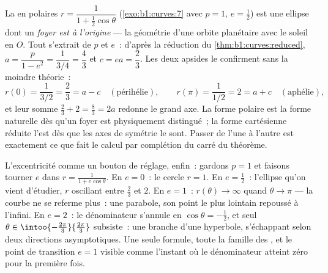 \begin{example}
\label{ex:b1:curves:orbit}
La  en polaires $r = \dfrac{1}{1 + \frac12\cos\theta}$
(\cref{exo:b1:curves:7} avec $p = 1$, $e = \frac12$) est une
ellipse dont un \emph{foyer est à l'origine} --- la géométrie d'une
orbite planétaire avec le soleil en $O$. Tout s'extrait de
$p$ et $e$~: d'après la réduction du
\cref{thm:b1:curves:reduced}, $a = \dfrac{p}{1 - e^2} =
\dfrac{1}{3/4} = \dfrac43$ et $c = ea = \dfrac23$. Les deux
apsides le confirment sans la moindre théorie~:
\[
r(0) = \frac{1}{3/2} = \frac23 = a - c
\quad (\text{périhélie}),
\qquad
r(\pi) = \frac{1}{1/2} = 2 = a + c
\quad (\text{aphélie}),
\]
et leur somme $\frac23 + 2 = \frac83 = 2a$ redonne le grand
axe. La forme polaire est la forme naturelle dès qu'un foyer est
physiquement distingué~; la forme cartésienne réduite l'est dès que
les axes de symétrie le sont. Passer de l'une à l'autre est
exactement ce que fait le calcul par complétion du carré du théorème.

L'excentricité comme un bouton de réglage, enfin~: gardons $p = 1$ et
faisons tourner $e$ dans $r = \frac{1}{1 + e\cos\theta}$. En $e = 0$~:
le cercle $r = 1$. En $e = \frac12$~: l'ellipse qu'on vient d'étudier,
$r$ oscillant entre $\frac23$ et $2$. En $e = 1$~: $r(\theta) \to \infty$
quand $\theta \to \pi$ --- la courbe ne se referme plus~: une parabole, son
point le plus lointain repoussé à l'infini. En $e = 2$~: le dénominateur
s'annule en $\cos\theta = -\frac12$, et seul $\theta \in
\intoo{-\frac{2\pi}3}{\frac{2\pi}3}$ subsiste~: une branche d'une
hyperbole, s'échappant selon deux directions asymptotiques. Une seule
formule, toute la famille des , et le point de transition $e =
1$ visible comme l'instant où le dénominateur atteint zéro pour la première fois.
\end{example}

